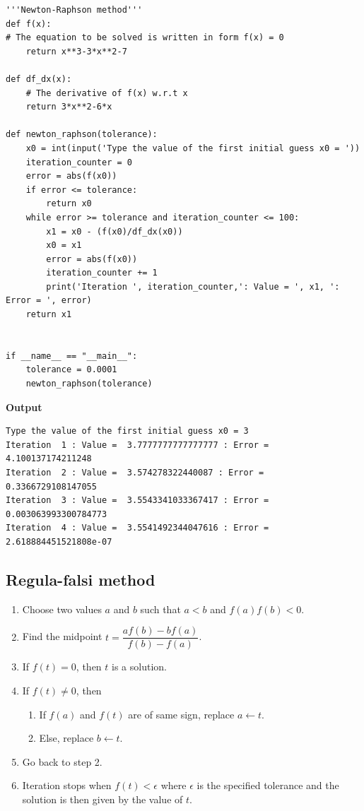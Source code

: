 \documentclass[a4paper,11pt]{book}
\begin{document}
\begin{lstlisting}
'''Newton-Raphson method'''
def f(x):
# The equation to be solved is written in form f(x) = 0
    return x**3-3*x**2-7

def df_dx(x):
    # The derivative of f(x) w.r.t x
    return 3*x**2-6*x

def newton_raphson(tolerance):
    x0 = int(input('Type the value of the first initial guess x0 = '))
    iteration_counter = 0
    error = abs(f(x0))
    if error <= tolerance:
        return x0
    while error >= tolerance and iteration_counter <= 100:
        x1 = x0 - (f(x0)/df_dx(x0))
        x0 = x1
        error = abs(f(x0))
        iteration_counter += 1
        print('Iteration ', iteration_counter,': Value = ', x1, ': Error = ', error)
    return x1


if __name__ == "__main__":
    tolerance = 0.0001
    newton_raphson(tolerance)
\end{lstlisting}
\textbf{Output}
\begin{lstlisting}
Type the value of the first initial guess x0 = 3
Iteration  1 : Value =  3.7777777777777777 : Error =  4.100137174211248
Iteration  2 : Value =  3.574278322440087 : Error =  0.3366729108147055
Iteration  3 : Value =  3.5543341033367417 : Error =  0.003063993300784773
Iteration  4 : Value =  3.5541492344047616 : Error =  2.618884451521808e-07
\end{lstlisting}

\subsection{Regula-falsi method}
\begin{enumerate}
    \item Choose two values $a$ and $b$ such that $a<b$ and $f(a)f(b) < 0$.
    \item Find the midpoint $t = \dfrac{af(b)-bf(a)}{f(b)-f(a)}$.
    \item If $f(t) = 0$, then $t$ is a solution.
    \item If $f(t) \neq 0$, then
    \begin{enumerate}
        \item If $f(a)$ and $f(t)$ are of same sign, replace $a \leftarrow t$.
        \item Else, replace $b \leftarrow t$.
    \end{enumerate}
    \item Go back to step 2.
    \item Iteration stops when $f(t) < \epsilon$ where $\epsilon$ is the specified tolerance and the solution is then given by the value of $t$.
\end{enumerate}
\end{document}
